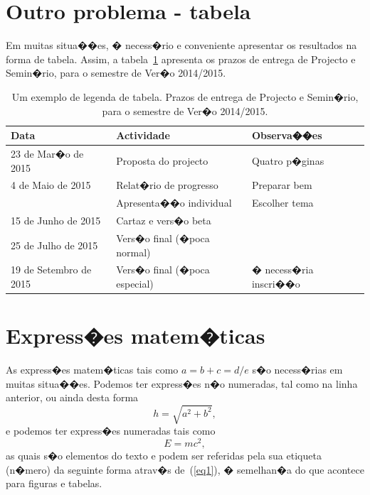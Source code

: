 %
%
\section{Outro problema - tabela} \label{sec23}
Em muitas situa��es, � necess�rio e conveniente apresentar os resultados na
forma de tabela. Assim, a tabela~\ref{tab1} apresenta os prazos de entrega de Projecto
e Semin�rio, para o semestre de Ver�o 2014/2015.

\begin{table} [h!]
\centering
\caption{Um exemplo de legenda de tabela. Prazos de entrega de Projecto
e Semin�rio, para o semestre de Ver�o 2014/2015.} \vspace{2mm}
\label{tab1}       %
\begin{tabular}{|l|l|l|}
\hline
\textbf{Data} & \textbf{Actividade} & \textbf{Observa��es}  \\ \hline
23 de Mar�o de 2015 & Proposta do projecto & Quatro p�ginas \\ \hline
4 de Maio de 2015 & Relat�rio de progresso & Preparar bem\\ \hline
									& Apresenta��o individual & Escolher tema \\ \hline
15 de Junho de 2015 & Cartaz e vers�o beta & \\ \hline
25 de Julho de 2015 & Vers�o final (�poca normal) & \\ \hline
19 de Setembro de 2015 & Vers�o final (�poca especial) & � necess�ria inscri��o\\ \hline
\end{tabular}
\end{table}


%
%
\section{Express�es matem�ticas} \label{sec24}
As express�es matem�ticas tais como $a= b + c = d/e$ s�o necess�rias em muitas situa��es.
Podemos ter express�es n�o numeradas, tal como na linha anterior, ou ainda desta forma
\begin{displaymath} 
h = \sqrt{a^2 + b^2},
\end{displaymath}
e podemos ter express�es numeradas tais como
\begin{equation} \label{eq1}
E = m c^2,
\end{equation}
as quais s�o elementos do texto e podem ser referidas pela sua etiqueta (n�mero) 
da seguinte forma atrav�s de~(\ref{eq1}), � semelhan�a do que acontece para 
figuras e tabelas.\\

